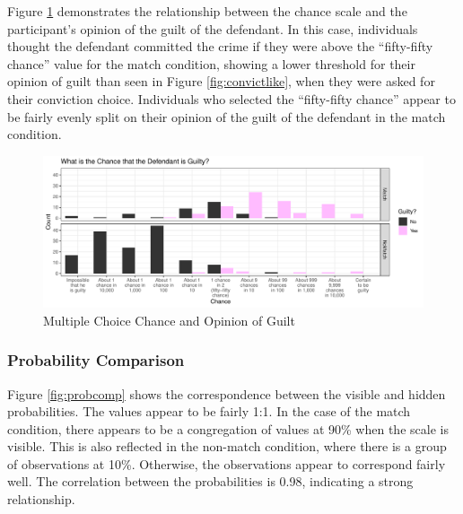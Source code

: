 \documentclass[print]{nuthesis}
\begin{document}
Figure \ref{fig:opinionlike} demonstrates the relationship between the chance scale and the participant's opinion of the guilt of the defendant.
In this case, individuals thought the defendant committed the crime if they were above the ``fifty-fifty chance'' value for the match condition, showing a lower threshold for their opinion of guilt than seen in Figure \ref{fig:convictlike}, when they were asked for their conviction choice.
Individuals who selected the ``fifty-fifty chance'' appear to be fairly evenly split on their opinion of the guilt of the defendant in the match condition.

\begin{figure}

{\centering \includegraphics[width=\linewidth]{thesis_files/figure-latex/opinionlike-1} 

}

\caption{Multiple Choice Chance and Opinion of Guilt}\label{fig:opinionlike}
\end{figure}

\hypertarget{probability-comparison}{%
\subsubsection{Probability Comparison}\label{probability-comparison}}

Figure \ref{fig:probcomp} shows the correspondence between the visible and hidden probabilities.
The values appear to be fairly 1:1.
In the case of the match condition, there appears to be a congregation of values at 90\% when the scale is visible.
This is also reflected in the non-match condition, where there is a group of observations at 10\%.
Otherwise, the observations appear to correspond fairly well.
The correlation between the probabilities is 0.98, indicating a strong relationship.
\end{document}
